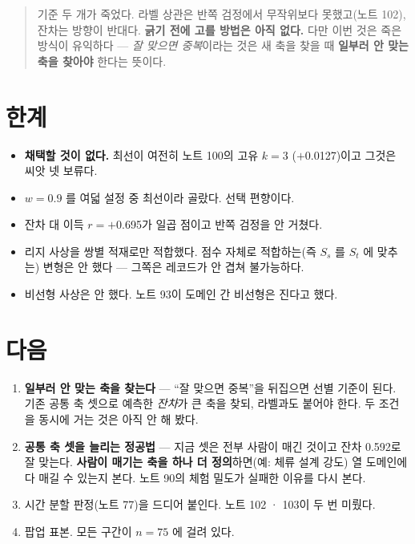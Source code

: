 \documentclass[10pt]{article}
\begin{document}
\begin{quote}\fontsize{9.5}{11.5}\selectfont
기준 두 개가 죽었다. 라벨 상관은 반쪽 검정에서 무작위보다 못했고(노트 102),
잔차는 방향이 반대다. \textbf{긁기 전에 고를 방법은 아직 없다.} 다만 이번
것은 죽은 방식이 유익하다 --- \emph{잘 맞으면 중복}이라는 것은 새 축을 찾을 때
\textbf{일부러 안 맞는 축을 찾아야} 한다는 뜻이다.
\end{quote}

\section{한계}

\begin{itemize}[leftmargin=1.1em,itemsep=0.15em]
\item \textbf{채택할 것이 없다.} 최선이 여전히 노트 100의 고유 $k{=}3$
      ($+$0.0127)이고 그것은 씨앗 넷 보류다.
\item $w{=}0.9$ 를 여덟 설정 중 최선이라 골랐다. 선택 편향이다.
\item 잔차 대 이득 $r{=}+$0.695가 일곱 점이고 반쪽 검정을 안 거쳤다.
\item 리지 사상을 쌍별 적재로만 적합했다. 점수 자체로 적합하는(즉 $S_s$ 를
      $S_t$ 에 맞추는) 변형은 안 했다 --- 그쪽은 레코드가 안 겹쳐 불가능하다.
\item 비선형 사상은 안 했다. 노트 93이 도메인 간 비선형은 진다고 했다.
\end{itemize}

\section{다음}

\begin{enumerate}[leftmargin=1.3em,itemsep=0.15em]
\item \textbf{일부러 안 맞는 축을 찾는다} --- ``잘 맞으면 중복''을 뒤집으면
      선별 기준이 된다. 기존 공통 축 셋으로 예측한 \emph{잔차}가 큰 축을
      찾되, 라벨과도 붙어야 한다. 두 조건을 동시에 거는 것은 아직 안 해 봤다.
\item \textbf{공통 축 셋을 늘리는 정공법} --- 지금 셋은 전부 사람이 매긴
      것이고 잔차 0.592로 잘 맞는다. \textbf{사람이 매기는 축을 하나 더
      정의}하면(예: 체류 설계 강도) 열 도메인에 다 매길 수 있는지 본다.
      노트 90의 체험 밀도가 실패한 이유를 다시 본다.
\item 시간 분할 판정(노트 77)을 드디어 붙인다. 노트 102 · 103이 두 번 미뤘다.
\item 팝업 표본. 모든 구간이 $n{=}75$ 에 걸려 있다.
\end{enumerate}
\end{document}
